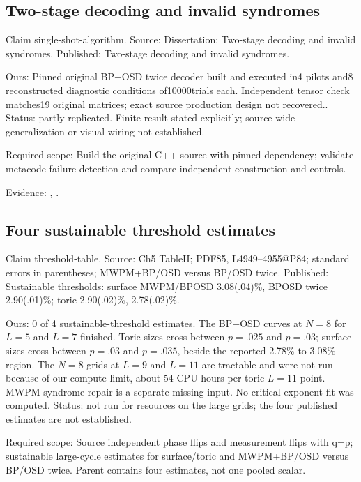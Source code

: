 \subsection{Two-stage decoding and invalid syndromes}\label{claim:single-shot-algorithm}
Claim single-shot-algorithm. Source: Dissertation: Two-stage decoding and invalid syndromes. Published: Two-stage decoding and invalid syndromes.

Ours: Pinned original BP+OSD twice decoder built and executed in4 pilots and8 reconstructed diagnostic conditions of10000trials each. Independent tensor check matches19 original matrices; exact source production design not recovered.. Status: partly replicated. Finite result stated explicitly; source-wide generalization or visual wiring not established.

Required scope: Build the original C++ source with pinned dependency; validate metacode failure detection and compare independent construction and controls.

Evidence: \href{https://github.com/alectionary/vibe-math/blob/master/formalization/quintavalle-hgp/sources/browser-extraction.txt}{}, \href{https://github.com/alectionary/vibe-math/blob/master/formalization/quintavalle-hgp/availability.md}{}.
\subsection{Four sustainable threshold estimates}\label{claim:threshold-table}
Claim threshold-table. Source: Ch5 TableII; PDF85, L4949--4955@P84; standard errors in parentheses; MWPM+BP/OSD versus BP/OSD twice. Published: Sustainable thresholds: surface MWPM/BPOSD 3.08(.04)\%, BPOSD twice 2.90(.01)\%; toric 2.90(.02)\%, 2.78(.02)\%.

Ours: 0 of 4 sustainable-threshold estimates. The BP+OSD curves at $N=8$ for $L=5$ and $L=7$ finished. Toric sizes cross between $p=.025$ and $p=.03$; surface sizes cross between $p=.03$ and $p=.035$, beside the reported 2.78\% to 3.08\% region. The $N=8$ grids at $L=9$ and $L=11$ are tractable and were not run because of our compute limit, about 54 CPU-hours per toric $L=11$ point. MWPM syndrome repair is a separate missing input. No critical-exponent fit was computed. Status: not run for resources on the large grids; the four published estimates are not established.

Required scope: Source independent phase flips and measurement flips with q=p; sustainable large-cycle estimates for surface/toric and MWPM+BP/OSD versus BP/OSD twice. Parent contains four estimates, not one pooled scalar.

